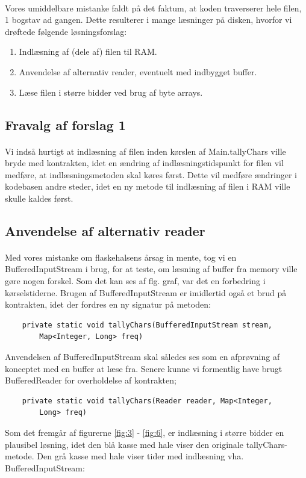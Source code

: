 \documentclass{article}
\begin{document}
\paragraph{}
Vores umiddelbare mistanke faldt på det faktum, at koden traverserer hele filen, 1 bogstav ad gangen. Dette resulterer i mange læsninger på disken, hvorfor vi drøftede følgende løsningsforslag:
\begin{enumerate}
    \item Indlæsning af (dele af) filen til RAM.
    \item Anvendelse af alternativ reader, eventuelt med indbygget buffer.
    \item Læse filen i større bidder ved brug af byte arrays.
\end{enumerate}
\subsection{Fravalg af forslag 1}
\paragraph{}Vi indså hurtigt at indlæsning af filen inden kørslen af Main.tallyChars ville bryde med kontrakten, idet en ændring af indlæsningstidspunkt for filen vil medføre, at indlæsningsmetoden skal køres først. Dette vil medføre ændringer i kodebasen andre steder, idet en ny metode til indlæsning af filen i RAM ville skulle kaldes først.
\subsection{Anvendelse af alternativ reader}
\paragraph{}Med vores mistanke om flaskehalsens årsag in mente, tog vi en BufferedInputStream i brug, for at teste, om læsning af buffer fra memory ville gøre nogen forskel. Som det kan ses af flg. graf, var det en forbedring i kørselstiderne. Brugen af BufferedInputStream er imidlertid også et brud på kontrakten, idet der fordres en ny signatur på metoden:
\begin{verbatim}
    private static void tallyChars(BufferedInputStream stream, 
        Map<Integer, Long> freq)
\end{verbatim}
Anvendelsen af BufferedInputStream skal således ses som en afprøvning af konceptet med en buffer at læse fra. Senere kunne vi formentlig have brugt BufferedReader for overholdelse af kontrakten;
\begin{verbatim}
    private static void tallyChars(Reader reader, Map<Integer, 
        Long> freq)
\end{verbatim}
Som det fremgår af figurerne \ref{fig:3} - \ref{fig:6}, er indlæsning i større bidder en plausibel løsning, idet den blå kasse med hale viser den originale tallyChars-metode. Den grå kasse med hale viser tider med indlæsning vha. BufferedInputStream:
\pagebreak
\end{document}

